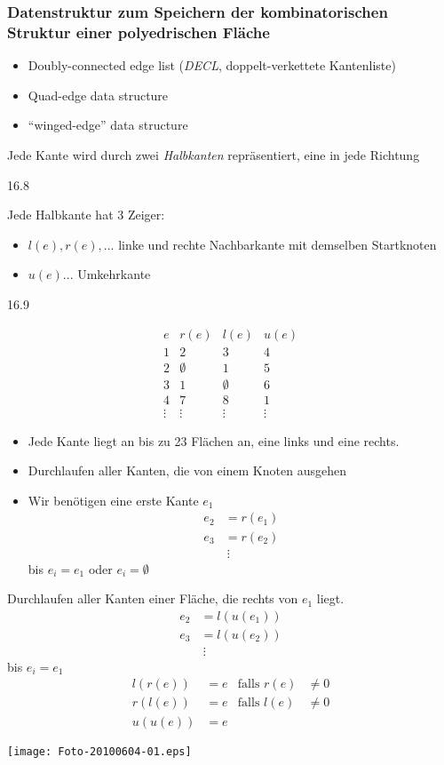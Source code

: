 \subsubsection{Datenstruktur zum Speichern der kombinatorischen Struktur einer polyedrischen Fläche}
\begin{itemize}
 \item Doubly-connected edge list (\emph{DECL}, doppelt-verkettete Kantenliste)
 \item Quad-edge data structure
 \item "`winged-edge"' data structure
\end{itemize}
Jede Kante wird durch zwei \emph{Halbkanten} repräsentiert, eine in jede Richtung
\begin{center}
 16.8
\end{center}
Jede Halbkante hat 3 Zeiger:
\begin{itemize}
 \item $l(e), r(e),...$ linke und rechte Nachbarkante mit demselben Startknoten
 \item $u(e)...$ Umkehrkante
\end{itemize}
\begin{center}
 16.9
\end{center}
\[
 \begin{array}{c||c|c|c}
  e & r(e) & l(e) & u(e)\\
  \hline\hline
  1 & 2 & 3 & 4\\
  2 &\emptyset & 1 & 5\\
  3 & 1 & \emptyset & 6\\
  4 & 7 & 8 & 1\\
  \vdots & \vdots & \vdots & \vdots
 \end{array}
\]
\begin{itemize}
\item Jede Kante liegt an bis zu 23 Flächen an, eine links und eine rechts.
\item Durchlaufen aller Kanten, die von einem Knoten ausgehen
\item Wir benötigen eine erste Kante $e_1$
	\begin{align*}
	 e_2 &= r(e_1)\\
	 e_3 &= r(e_2)\\
	&\ \vdots
	\end{align*}
	bis $e_i = e_1$ oder $e_i = \emptyset$
\end{itemize}
Durchlaufen aller Kanten einer Fläche, die rechts von $e_1$ liegt.
\begin{align*}
 e_2 &= l(u(e_1)) \\
 e_3 &= l(u(e_2)) \\
     &\ \vdots
\end{align*}
bis $e_i = e_1$
\begin{align*}
 l(r(e)) &= e & \text{falls } r(e) &\neq 0\\
 r(l(e)) &= e & \text{falls } l(e) &\neq 0\\
 u(u(e)) &= e
\end{align*}
\begin{center}
 \texttt{[image: Foto-20100604-01.eps]}
\end{center}


